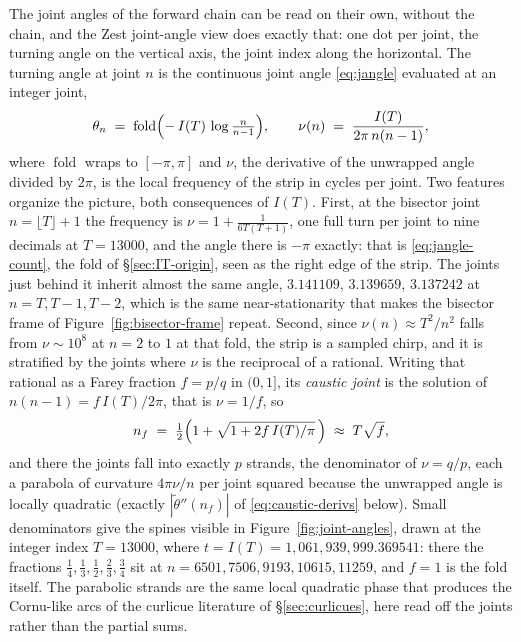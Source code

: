 \documentclass[11pt]{article}
\theoremstyle{definition}
\begin{document}
The joint angles of the forward chain can be read on their own, without the
chain, and the Zest joint-angle view does exactly that: one dot per joint,
the turning angle on the vertical axis, the joint index along the horizontal.
The turning angle at joint $n$ is the continuous joint angle \eqref{eq:jangle}
evaluated at an integer joint,
\begin{equation}\label{eq:theta-joint}
\theta_n \;=\; \operatorname{fold}\Bigl(-\,I(T)\,\log\tfrac{n}{n-1}\Bigr),
\qquad
\nu(n) \;=\; \frac{I(T)}{2\pi\,n(n-1)},
\end{equation}
where $\operatorname{fold}$ wraps to $[-\pi,\pi]$ and $\nu$, the derivative of
the unwrapped angle divided by $2\pi$, is the local frequency of the strip in
cycles per joint. Two features organize the picture, both consequences of
$I(T)$. First, at the bisector joint $n=\lfloor T\rfloor+1$ the frequency is
$\nu=1+\frac{1}{6T(T+1)}$, one full turn per joint to nine decimals at
$T=13000$, and the angle there is $-\pi$ exactly: that is
\eqref{eq:jangle-count}, the fold of \S\ref{sec:IT-origin}, seen as the right
edge of the strip. The joints just behind it inherit almost the same angle,
$3.141109$, $3.139659$, $3.137242$ at $n=T,T-1,T-2$, which is the same
near-stationarity that makes the bisector frame of
Figure~\ref{fig:bisector-frame} repeat. Second, since
$\nu(n)\approx T^{2}/n^{2}$ falls from $\nu\sim10^{8}$ at $n=2$ to $1$ at that
fold, the strip is a sampled chirp, and it is stratified by the joints where
$\nu$ is the reciprocal of a rational. Writing that rational as a Farey
fraction $f=p/q$ in $(0,1]$, its \emph{caustic joint} is the solution of
$n(n-1)=f\,I(T)/2\pi$, that is $\nu=1/f$, so
\begin{equation}\label{eq:caustic-joint}
n_{f}\;=\;\tfrac12\Bigl(1+\sqrt{1+2f\,I(T)/\pi}\,\Bigr)\;\approx\;T\sqrt{f},
\end{equation}
and there the joints fall into exactly $p$ strands, the denominator of
$\nu=q/p$, each a parabola of curvature $4\pi\nu/n$ per joint squared because
the unwrapped angle is locally quadratic (exactly
$|\widetilde\theta''(n_f)|$ of \eqref{eq:caustic-derivs} below). Small denominators give the spines
visible in Figure~\ref{fig:joint-angles}, drawn at the integer index $T=13000$,
where $t=I(T)=1{,}061{,}939{,}999.369541$: there the fractions
$\tfrac14,\tfrac13,\tfrac12,\tfrac23,\tfrac34$ sit at
$n=6501,7506,9193,10615,11259$, and $f=1$ is the fold itself. The parabolic
strands are the same local quadratic phase that produces the Cornu-like arcs of
the curlicue literature of \S\ref{sec:curlicues}, here read off the joints
rather than the partial sums.
\end{document}
